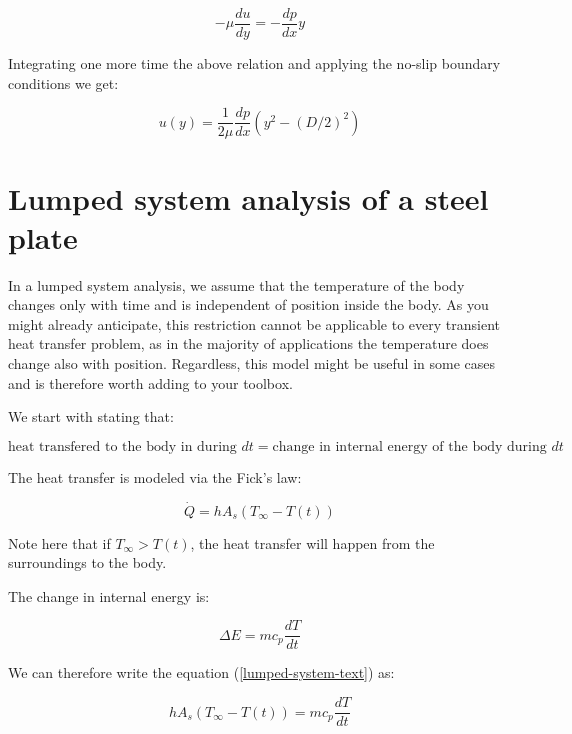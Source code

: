 \documentclass[10pt]{article}
\begin{document}
\begin{equation}
- \mu \frac{du}{dy} = - \frac{dp}{dx} y
\end{equation}

Integrating one more time the above relation and applying the no-slip boundary conditions we get:

\begin{equation}
u(y) = \frac{1}{2 \mu} \frac{dp}{dx} (y^2 - (D/2)^2)
\end{equation}


\newpage

\section{Lumped system analysis of a steel plate}

In a lumped system analysis, we assume that the temperature of the body changes only with time and is independent of position inside the body. As you might already anticipate, this restriction cannot be applicable to every transient heat transfer problem, as in the majority of applications the temperature does change also with position. Regardless, this model might be useful in some cases and is therefore worth adding to your toolbox.

We start with stating that:

\begin{equation} \label{lumped-system-text}
\text{heat transfered to the body in during $dt$} = \text{change in internal energy of the body during $dt$}
\end{equation}

The heat transfer is modeled via the Fick's law:

\begin{equation}
\dot{Q} = h A_s (T_{\infty} - T(t))
\end{equation}

Note here that if $T_{\infty} > T(t)$, the heat transfer will happen from the surroundings to the body.

The change in internal energy is:

\begin{equation}
\Delta E = m c_p \frac{dT}{dt}
\end{equation}

We can therefore write the equation (\ref{lumped-system-text}) as:

\begin{equation}
h A_s (T_{\infty} - T(t)) = m c_p \frac{dT}{dt}
\end{equation}
\end{document}
